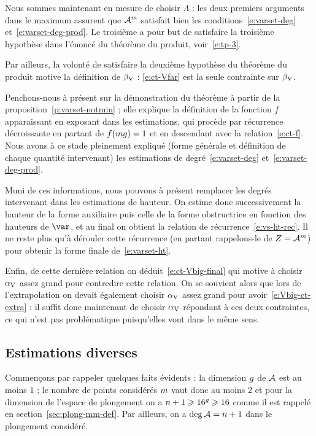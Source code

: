 Nous sommes maintenant en mesure de choisir \( \Lambda \) : les deux premiers
arguments dans le maximum assurent que \( \mathcal A^m \) satisfait bien les
conditions~\eqref{e:varset-deg} et~\eqref{e:varset-deg-prod}. Le troisième a
pour but de satisfaire la troisième hypothèse dans l'énoncé du théorème du
produit, voir~\eqref{e:tp-3}.

Par ailleurs, la volonté de satisfaire la deuxième hypothèse du théorème du
produit motive la définition de \( \beta \sb{\mathrm{V}} \) : \eqref{e:ct-Vfar} est la seule
contrainte sur \( \beta \sb{\mathrm{V}} \).

Penchons-nous à présent sur la démonstration du théorème à partir de la
proposition~\ref{p:varset-notmin} ; elle explique la définition de la fonction
\( f \) apparaissant en exposant dans les estimations, qui procède par
récurrence décroissante en partant de \( f(mg) = 1 \) et en
descendant avec la relation~\eqref{e:ct-f}. Nous avons à ce stade pleinement
expliqué (forme générale et définition de chaque quantité intervenant) les
estimations de degré~\eqref{e:varset-deg} et~\eqref{e:varset-deg-prod}.

Muni de ces informations, nous pouvons à présent remplacer les degrés
intervenant dans les estimations de hauteur. On estime donc successivement la
hauteur de la forme auxiliaire puis celle de la forme obstructrice en fonction
des hauteurs de \( \var \), et au final on obtient la relation de
récurrence~\eqref{e:vs-ht-rec}. Il ne reste plus qu'à dérouler cette
récurrence (en partant rappelons-le de \( Z = \mathcal A^m \)) pour obtenir la
forme finale de~\eqref{e:varset-ht}.

Enfin, de cette dernière relation on déduit~\eqref{e:ct-Vbig-final} qui
motive à choisir \( \alpha \sb{\mathrm{V}} \) assez grand pour contredire cette relation. On se
souvient alors que lors de l'extrapolation on devait également choisir \( \alpha \sb{\mathrm{V}}
\) assez grand pour avoir~\eqref{e:Vbig-ct-extra} : il suffit donc maintenant
de choisir \( \alpha \sb{\mathrm{V}} \) répondant à ces deux contraintes, ce qui n'est pas
problématique puisqu'elles vont dans le même sens.


\subsection{Estimations diverses}

Commençons par rappeler quelques faits évidents : la dimension \( g \) de
\( \mathcal A \) est au moins \( 1 \) ; le nombre de points considérés \( m \)
vaut donc au moins \( 2 \) et pour la dimension de l'espace de plongement on a
\( n + 1 \geqslant 16^g \geqslant 16 \) comme il est rappelé en
section~\ref{sec:plong-mm-def}. Par ailleurs, \todo[référence] on a \( \deg
  \mathcal A = n + 1 \) dans le plongement considéré.

